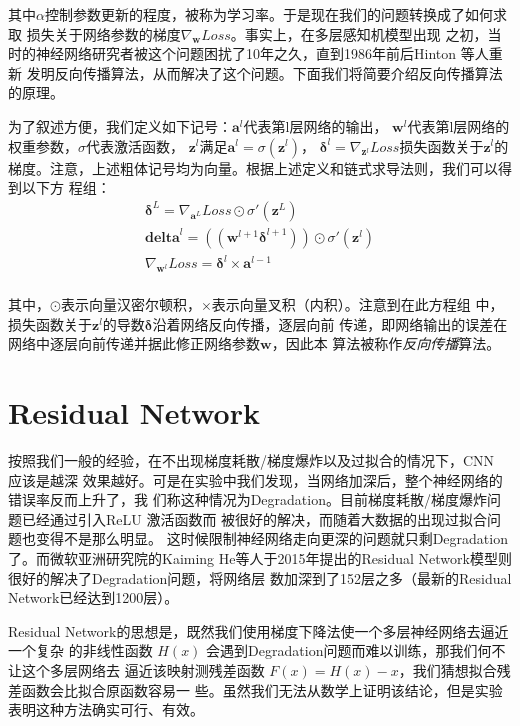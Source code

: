 其中$\alpha$控制参数更新的程度，被称为学习率。于是现在我们的问题转换成了如何求取
损失关于网络参数的梯度$\nabla_{\mathbf{w}}{Loss}$。事实上，在多层感知机模型出现
之初，当时的神经网络研究者被这个问题困扰了10年之久，直到1986年前后Hinton 等人重新
发明反向传播算法，从而解决了这个问题。下面我们将简要介绍反向传播算法的原理。

为了叙述方便，我们定义如下记号：$\mathbf{a}^{l}$代表第l层网络的输出，
$\mathbf{w}^{l}$代表第l层网络的权重参数，$\sigma$代表激活函数，
$\mathbf{z}^{l}$满足$\mathbf{a}^{l} = \sigma(\mathbf{z}^{l})$，
$\mathbf{\delta}^{l} = \nabla_{\mathbf{z}^l}{Loss}$损失函数关于$\mathbf{z}^l$的
梯度。注意，上述粗体记号均为向量。根据上述定义和链式求导法则，我们可以得到以下方
程组：
\begin{equation}
\begin{aligned}
  \mathbf{\delta}^L = \nabla_{\mathbf{a}^L}{Loss} \odot \sigma'(\mathbf{z}^L) \\
  \mathbf{delta}^l = ((\mathbf{w}^{l+1}\mathbf{\delta}^{l+1})) \odot \sigma'(\mathbf{z}^l) \\
  \nabla_{\mathbf{w}^l}{Loss} = \mathbf{\delta}^l \times \mathbf{a}^{l-1} \\
\end{aligned}
\end{equation}

其中，$\odot$表示向量汉密尔顿积，$\times$表示向量叉积（内积）。注意到在此方程组
中，损失函数关于$\mathbf{z}^l$的导数$\mathbf{\delta}$沿着网络反向传播，逐层向前
传递，即网络输出的误差在网络中逐层向前传递并据此修正网络参数$\mathbf{w}$，因此本
算法被称作\textit{反向传播}算法。

\section{Residual Network}

按照我们一般的经验，在不出现梯度耗散/梯度爆炸以及过拟合的情况下，CNN 应该是越深
效果越好。可是在实验中我们发现，当网络加深后，整个神经网络的错误率反而上升了，我
们称这种情况为Degradation。目前梯度耗散/梯度爆炸问题已经通过引入ReLU 激活函数而
被很好的解决\cite{Nair:2010vq}，而随着大数据的出现过拟合问题也变得不是那么明显。
这时候限制神经网络走向更深的问题就只剩Degradation了。而微软亚洲研究院的Kaiming
He等人于2015年提出的Residual Network模型则很好的解决了Degradation问题，将网络层
数加深到了152层之多（最新的Residual Network已经达到1200层）。

Residual Network的思想是，既然我们使用梯度下降法使一个多层神经网络去逼近一个复杂
的非线性函数 $H(x)$ 会遇到Degradation问题而难以训练，那我们何不让这个多层网络去
逼近该映射测残差函数 $F(x) = H(x) - x$，我们猜想拟合残差函数会比拟合原函数容易一
些。虽然我们无法从数学上证明该结论，但是实验表明这种方法确实可行、有效。

